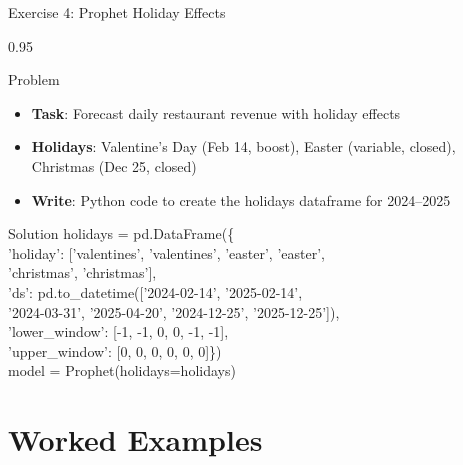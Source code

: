 \documentclass[9pt, aspectratio=169, t]{beamer}
\begin{document}
\begin{frame}{Exercise 4: Prophet Holiday Effects}
    \begin{cminipage}{0.95\textwidth}
    {\small
    \begin{alertblock}{Problem}
        \begin{itemize}\setlength{\itemsep}{0pt}
            \item \textbf{Task}: Forecast daily restaurant revenue with holiday effects
            \item \textbf{Holidays}: Valentine's Day (Feb 14, boost), Easter (variable, closed), Christmas (Dec 25, closed)
            \item \textbf{Write}: Python code to create the holidays dataframe for 2024--2025
        \end{itemize}
    \end{alertblock}

    \vspace{0.1cm}
    \begin{exampleblock}{Solution}
        {\scriptsize\ttfamily
        holidays = pd.DataFrame(\{\\
        \quad 'holiday': ['valentines', 'valentines', 'easter', 'easter',\\
        \quad\quad\quad\quad\quad\quad 'christmas', 'christmas'],\\
        \quad 'ds': pd.to\_datetime(['2024-02-14', '2025-02-14',\\
        \quad\quad\quad '2024-03-31', '2025-04-20', '2024-12-25', '2025-12-25']),\\
        \quad 'lower\_window': [-1, -1, 0, 0, -1, -1],\\
        \quad 'upper\_window': [0, 0, 0, 0, 0, 0]\})\\
        model = Prophet(holidays=holidays)
        }
    \end{exampleblock}
    }
    \end{cminipage}
\end{frame}

\section{Worked Examples}
\end{document}
